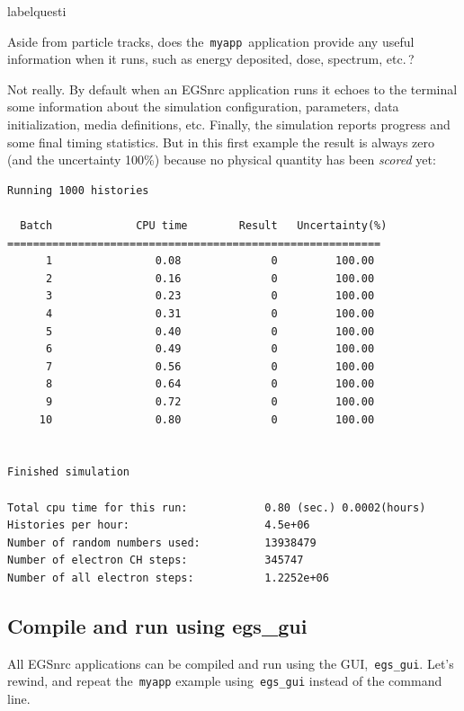 \documentclass[12pt,twoside]{article}
\makeatletter
\renewcommand\thequesti         {\@arabic\c@questi}
\newenvironment{question}{
    \bfseries
    \edef\@questictr{questi}
    \expandafter
    \list \csname label\@questictr\endcsname {
        \usecounter\@questictr\def\makelabel##1{\hss\llap{##1}}
        \savebox{\questbox}             {\thequesti}
        \setlength\labelsep             {0.6em}
        \setlength\labelwidth           {\wd\questbox}
        \setlength\leftmargini          {\labelwidth}
        \addtolength{\leftmargini}      {\labelsep}
        \addtolength{\leftmargini}      {0.2em}
        \leftmargin\leftmargini
        \setlength\topsep               {1em}
        \setlength\itemsep              {1.2em}
        \setlength\parsep               {0.5em}
    }
}{\normalfont\endlist}
\newenvironment{answer}{\normalfont}{\relax}
\makeatother
\begin{document}
\begin{question}
\item Aside from particle tracks, does the \,\Verb+myapp+\, application
provide any useful information when it runs, such as energy deposited,
dose, spectrum, etc.\,?

\begin{answer}
Not really. By default when an EGSnrc application runs it echoes to the
terminal some information about the simulation configuration,
parameters, data initialization, media definitions, etc. Finally, the
simulation reports progress and some final timing statistics. But in
this first example the result is always zero (and the uncertainty 100\%)
because no physical quantity has been \textit{scored} yet:

{\scriptsize
\begin{lstlisting}[language={},backgroundcolor=\color{white}]
Running 1000 histories

  Batch             CPU time        Result   Uncertainty(%)
==========================================================
      1                0.08              0         100.00
      2                0.16              0         100.00
      3                0.23              0         100.00
      4                0.31              0         100.00
      5                0.40              0         100.00
      6                0.49              0         100.00
      7                0.56              0         100.00
      8                0.64              0         100.00
      9                0.72              0         100.00
     10                0.80              0         100.00


Finished simulation

Total cpu time for this run:            0.80 (sec.) 0.0002(hours)
Histories per hour:                     4.5e+06
Number of random numbers used:          13938479
Number of electron CH steps:            345747
Number of all electron steps:           1.2252e+06
\end{lstlisting}
}
\end{answer}

\end{question}

\clearpage
\subsection{Compile and run using egs\_gui}
All EGSnrc applications can be compiled and run using the GUI, \,\Verb|egs_gui|.
Let's rewind, and repeat the \,\Verb|myapp| example using \,\Verb|egs_gui|
instead of the command line.
\end{document}

